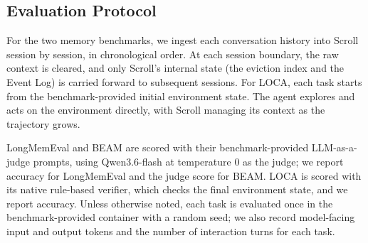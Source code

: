 \subsection{Evaluation Protocol}
\label{sec:setup-protocol}

For the two memory benchmarks, we ingest each conversation history into Scroll session by session, in chronological order. At each session boundary, the raw context is cleared, and only Scroll's internal state (the eviction index and the Event Log) is carried forward to subsequent sessions.
For LOCA, each task starts from the benchmark-provided initial environment state. The agent explores and acts on the environment directly, with Scroll managing its context as the trajectory grows.

LongMemEval and BEAM are scored with their benchmark-provided LLM-as-a-judge prompts, using Qwen3.6-flash at temperature \(0\) as the judge; we report accuracy for LongMemEval and the judge score for BEAM. LOCA is scored with its native rule-based verifier, which checks the final environment state, and we report accuracy. Unless otherwise noted, each task is evaluated once in the benchmark-provided container with a random seed; we also record model-facing input and output tokens and the number of interaction turns for each task.
